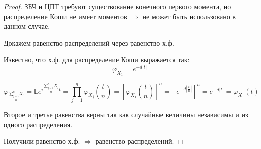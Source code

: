 \documentclass[a4paper,12pt]{article}
\newcommand{\lt}{\left}
\newcommand{\rt}{\right}
\newcommand{\fr}{\frac}
\newcommand{\bb}{\mathbb}
\newcommand{\vp}{\varphi}
\begin{document}
\begin{proof}

ЗБЧ и ЦПТ требуют существование конечного первого момента, но распределение Коши не имеет моментов $\Rightarrow$ не может быть использовано в данном случае.

Докажем равенство распределений через равенство х.ф.

Известно, что х.ф. для распределение Коши выражается так:
$$\vp_{X_1} = e^{-d|t|}$$

$$\vp_{\fr{\sum\limits_{j=1}^{n}X_j}{n}} = \bb Ee^{i\fr{\sum\limits_{j=1}^{n}X_j}{n}t}  = \prod\limits_{j=1}^{n} \vp_{X_j}\lt(\fr{t}{n}\rt) = \lt[\vp_{X_1}\lt(\fr{t}{n}\rt)\rt]^n = \lt[e^{-d|\fr{t}{n}|}\rt]^n = e^{-d|t|} = \vp_{X_1}(t)$$

Второе и третье равенства верны так как случайные величины независимы и из одного распределения.

Получили равенство х.ф.
$\Rightarrow$ равенство распределений.
\end{proof}
\end{document}
